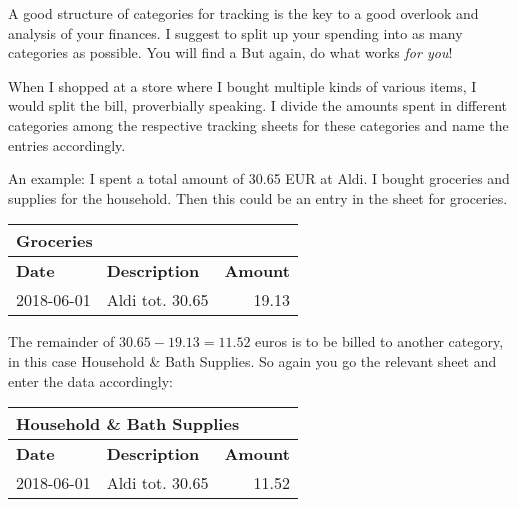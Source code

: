 A good structure of categories for tracking is the key to a good overlook and analysis of your finances.
I suggest to split up your spending into as many categories as possible.
You will find a 
But again, do what works \emph{for you}!

When I shopped at a store where I bought multiple kinds of various items, I would split the bill, proverbially speaking.
I divide the amounts spent in different categories among the respective tracking sheets for these categories and name the entries accordingly.

An example: I spent a total amount of 30.65 EUR at Aldi.
I bought groceries and supplies for the household.
Then this could be an entry in the sheet for groceries.
\begin{center}\sffamily
	\begin{tabular}{|l|l|r|}
		\multicolumn{3}{l}{Groceries}\\
		\hline
		\textbf{Date} & \textbf{Description} & \textbf{Amount}\rmfamily\\
		\hline
		2018-06-01 & Aldi tot. 30.65 & 19.13\\
		\hline
	\end{tabular}
\end{center}
The remainder of \( 30.65 - 19.13 = 11.52 \) euros is to be billed to another category, in this case Household \& Bath Supplies.
So again you go the relevant sheet and enter the data accordingly:
\begin{center}\sffamily
	\begin{tabular}{|l|l|r|}
		\multicolumn{3}{l}{Household \& Bath Supplies}\\			
		\hline
		\textbf{Date} & \textbf{Description} & \textbf{Amount}\\
		\hline
		2018-06-01 & Aldi tot. 30.65 & 11.52\\
		\hline
	\end{tabular}
\end{center}

